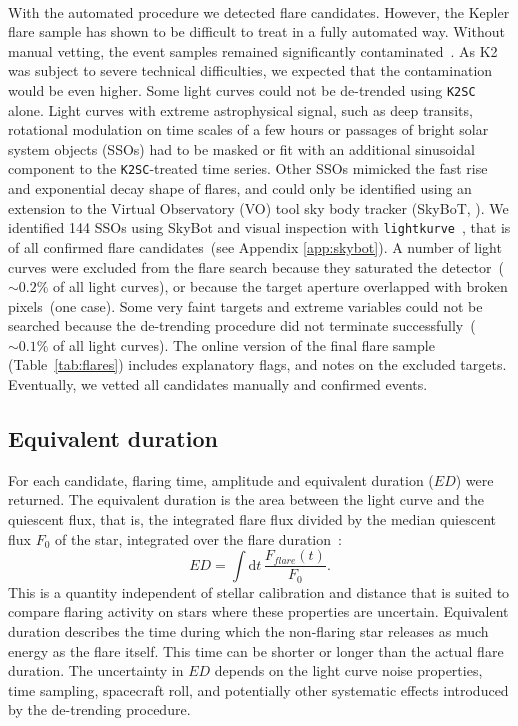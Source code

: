 \documentclass{aa}
\begin{document}
\\
With the automated procedure we detected flare candidates. However, the Kepler flare sample has shown to be difficult to treat in a fully automated way. Without manual vetting, the event samples remained significantly contaminated~\citep{yang2019}. As K2 was subject to severe technical difficulties, we expected that the contamination would be even higher. Some light curves could not be de-trended using \texttt{K2SC} alone. Light curves with extreme astrophysical signal, such as deep transits, rotational modulation on time scales of a few hours or passages of bright solar system objects (SSOs) had to be masked or fit with an additional sinusoidal component to the \texttt{K2SC}-treated time series. Other SSOs mimicked the fast rise and exponential decay shape of flares, and could only be identified using an extension to the Virtual Observatory (VO) tool sky body tracker (SkyBoT, \citealt{berthier2006, berthier2016}). We identified 144 SSOs using SkyBot and visual inspection with \texttt{lightkurve}~\citep{lightkurve2018}, that is of all confirmed flare candidates~(see Appendix \ref{app:skybot}). A number of light curves were excluded from the flare search because they saturated the detector~($\sim 0.2\%$ of all light curves), or because the target aperture overlapped with broken pixels~(one case). Some very faint targets and extreme variables could not be searched because the de-trending procedure did not terminate successfully~($\sim 0.1\%$ of all light curves). The online version of the final flare sample (Table~\ref{tab:flares}) includes explanatory flags, and notes on the excluded targets. Eventually, we vetted all candidates manually and confirmed events.
\subsection{Equivalent duration}
\label{sec:ed}
For each candidate, flaring time, amplitude and equivalent duration ($ED$) were returned.
The equivalent duration is the area between the light curve and the quiescent flux, that is, the integrated flare flux divided by the median quiescent flux $F_0$ of the star, integrated over the flare duration~\citep{gershberg1972}:
\begin{equation}
\label{eq:ED}
ED=\displaystyle \int \mathrm dt\, \frac{F_{flare}(t)}{F_0}.
\end{equation}
This is a quantity independent of stellar calibration and distance that is suited to compare flaring activity on stars where these properties are uncertain. Equivalent duration describes the time during which the non-flaring star releases as much energy as the flare itself. This time can be shorter or longer than the actual flare duration. The uncertainty in $ED$ depends on the light curve noise properties, time sampling, spacecraft roll, and potentially other systematic effects introduced by the de-trending procedure. 
\end{document}
